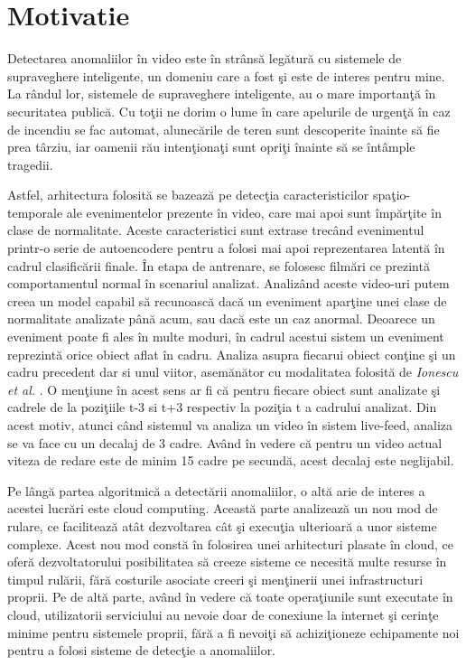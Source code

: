 \documentclass[a4paper,12pt]{report}
\begin{document}
\section{Motivatie}
\quad Detectarea anomaliilor în video este în strânsă legătură cu sistemele de supraveghere inteligente, un domeniu care a fost şi este de interes pentru mine. La rândul lor, sistemele de supraveghere inteligente, au o mare importanţă în securitatea publică. Cu toţii ne dorim o lume în care apelurile de urgenţă în caz de incendiu se fac automat, alunecările de teren sunt descoperite înainte să fie prea târziu, iar oamenii rău intenţionaţi sunt opriţi înainte să se întâmple tragedii. 
\par
Astfel, arhitectura folosită se bazează pe detecţia caracteristicilor spaţio-temporale ale evenimentelor prezente în video, care mai apoi sunt împărţite în clase de normalitate. Aceste caracteristici sunt extrase trecând evenimentul printr-o serie de autoencodere pentru a folosi mai apoi reprezentarea latentă în cadrul clasificării finale. În etapa de antrenare, se folosesc filmări ce prezintă comportamentul normal în scenariul analizat. Analizând aceste video-uri putem creea un model capabil să recunoască dacă un eveniment aparţine unei clase de normalitate analizate până acum, sau dacă este un caz anormal. Deoarece un eveniment poate fi ales în multe moduri, în cadrul acestui sistem un eveniment reprezintă orice obiect aflat în cadru. Analiza asupra fiecarui obiect conţine şi un cadru precedent dar si unul viitor, asemănător cu modalitatea folosită de \emph{Ionescu et al.}  \cite{ionescu2019object}. O menţiune în acest sens ar fi că  pentru fiecare obiect sunt analizate şi cadrele de la poziţiile t-3 si t+3  respectiv la poziţia t a cadrului analizat. Din acest motiv, atunci când sistemul va analiza un video în sistem live-feed, analiza se va face cu un decalaj de 3 cadre. Având în vedere că pentru un video actual viteza de redare este de minim 15 cadre pe secundă, acest decalaj este neglijabil.
\par
Pe lângă partea algoritmică a detectării anomaliilor, o altă arie de interes a acestei lucrări este cloud computing. Această parte analizează un nou mod de rulare, ce facilitează atât dezvoltarea cât şi execuţia ulterioară a unor sisteme complexe. Acest nou mod constă în folosirea unei arhitecturi plasate în cloud, ce oferă dezvoltatorului posibilitatea să creeze sisteme ce necesită multe resurse în timpul rulării, fără costurile asociate creeri şi menţinerii unei infrastructuri proprii. Pe de altă parte, având în vedere că toate operaţiunile sunt executate în cloud, utilizatorii serviciului au nevoie doar de conexiune la internet şi cerinţe minime pentru sistemele proprii, fără a fi nevoiţi să achiziţioneze echipamente noi pentru a folosi sisteme de detecţie a anomaliilor.
\end{document}
